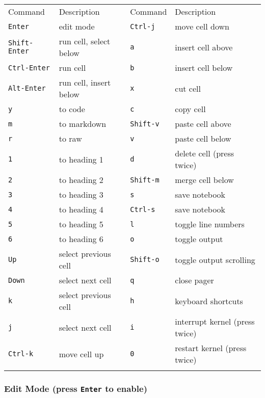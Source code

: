 \documentclass{article}
\begin{document}
\begin{longtable}[c]{@{}llll@{}}
\toprule\addlinespace
Command & Description & Command & Description
\\\addlinespace
\midrule\endhead
\texttt{Enter} & edit mode & \texttt{Ctrl-j} & move cell down
\\\addlinespace
\texttt{Shift-Enter} & run cell, select below & \texttt{a} & insert cell
above
\\\addlinespace
\texttt{Ctrl-Enter} & run cell & \texttt{b} & insert cell below
\\\addlinespace
\texttt{Alt-Enter} & run cell, insert below & \texttt{x} & cut cell
\\\addlinespace
\texttt{y} & to code & \texttt{c} & copy cell
\\\addlinespace
\texttt{m} & to markdown & \texttt{Shift-v} & paste cell above
\\\addlinespace
\texttt{r} & to raw & \texttt{v} & paste cell below
\\\addlinespace
\texttt{1} & to heading 1 & \texttt{d} & delete cell (press twice)
\\\addlinespace
\texttt{2} & to heading 2 & \texttt{Shift-m} & merge cell below
\\\addlinespace
\texttt{3} & to heading 3 & \texttt{s} & save notebook
\\\addlinespace
\texttt{4} & to heading 4 & \texttt{Ctrl-s} & save notebook
\\\addlinespace
\texttt{5} & to heading 5 & \texttt{l} & toggle line numbers
\\\addlinespace
\texttt{6} & to heading 6 & \texttt{o} & toggle output
\\\addlinespace
\texttt{Up} & select previous cell & \texttt{Shift-o} & toggle output
scrolling
\\\addlinespace
\texttt{Down} & select next cell & \texttt{q} & close pager
\\\addlinespace
\texttt{k} & select previous cell & \texttt{h} & keyboard shortcuts
\\\addlinespace
\texttt{j} & select next cell & \texttt{i} & interrupt kernel (press
twice)
\\\addlinespace
\texttt{Ctrl-k} & move cell up & \texttt{0} & restart kernel (press
twice)
\\\addlinespace
\bottomrule
\end{longtable}

\subsubsection{Edit Mode (press \texttt{Enter} to
enable)}\label{edit-mode-press-enter-to-enable}
\end{document}
